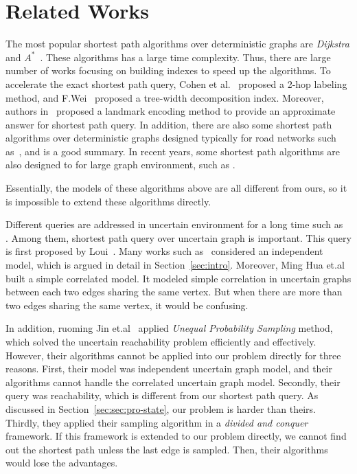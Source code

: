 \documentclass[runningheads,a4paper]{llncs}
\begin{document}
\vspace{-0.4cm}
\section{Related Works}
\label{sec:relate}
\vspace{-0.2cm}

The most popular shortest path algorithms over deterministic graphs are \emph{Dijkstra} \cite{bast2006transit} and $A^{*}$~\cite{fu2006heuristic}. These algorithms has a large time complexity. Thus, there are large number of works focusing on building indexes to speed up the algorithms. To accelerate the exact shortest path query, Cohen et al.~\cite{cohen2003reachability} proposed a 2-hop labeling method, and F.Wei~\cite{wei2010tedi} proposed a tree-width decomposition index. Moreover, authors in~\cite{gubichev2010fast} proposed a landmark encoding method to provide an approximate answer for shortest path query. In addition, there are also some shortest path algorithms over deterministic graphs designed typically for road networks such as~\cite{sankaranarayanan2009path}\cite{samet2008scalable}\cite{rice2010graph}\cite{jing1998hierarchical}, and \cite{wu2012shortest} is a good summary. In recent years, some shortest path algorithms are also designed to for large graph environment, such as \cite{jin2012highway}\cite{cheng2012efficient}\cite{gao2011relational}.

Essentially, the models of these algorithms above are all different from ours, so it is impossible to extend these algorithms directly.

Different queries are addressed in uncertain environment for a long time such as~\cite{tong2012mining} \cite{tong2012discovering}\cite{yuan2011efficient}\cite{yuan2013efficient}. Among them, shortest path query over uncertain graph is important. This query is first proposed by Loui~\cite{loui1983optimal}. Many works such as~\cite{yuan2010efficiently}\cite{zou2011top} considered an independent model, which is argued in detail in Section~\ref{sec:intro}. Moreover, Ming Hua et.al~\cite{hua2010probabilistic} built a simple correlated model. It modeled simple correlation in uncertain graphs between each two edges sharing the same vertex. But when there are more than two edges sharing the same vertex, it would be confusing.

In addition, ruoming Jin et.al~\cite{jin2011distance} applied \emph{Unequal Probability Sampling} method, which solved the uncertain reachability problem efficiently and effectively. However, their algorithms cannot be applied into our problem directly for three reasons. First, their model was independent uncertain graph model, and their algorithms cannot handle the correlated uncertain graph model. Secondly, their query was reachability, which is different from our shortest path query. As discussed in Section~\ref{sec:sec:pro-state}, our problem is harder than theirs. Thirdly, they applied their sampling algorithm in a \emph{divided and conquer} framework. If this framework is extended to our problem directly, we cannot find out the shortest path unless the last edge is sampled. Then, their algorithms would lose the advantages.
\end{document}
